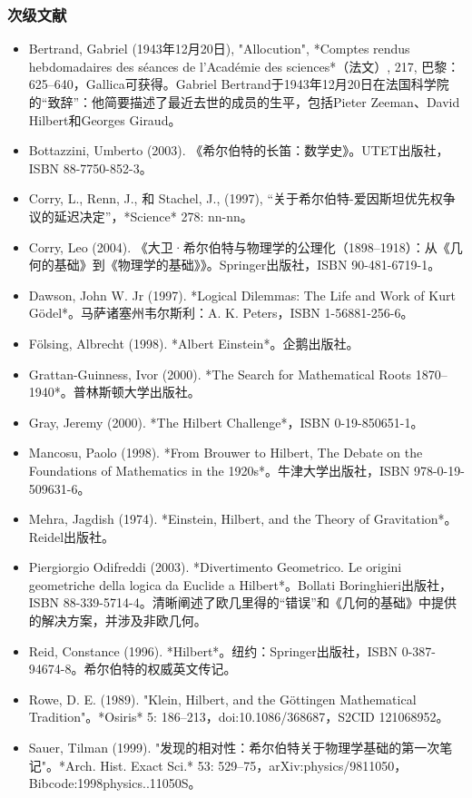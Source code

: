 \subsubsection{次级文献}
\begin{itemize}
\item Bertrand, Gabriel (1943年12月20日), "Allocution", *Comptes rendus hebdomadaires des séances de l'Académie des sciences*（法文）, 217, 巴黎：625–640，Gallica可获得。Gabriel Bertrand于1943年12月20日在法国科学院的“致辞”：他简要描述了最近去世的成员的生平，包括Pieter Zeeman、David Hilbert和Georges Giraud。
\item Bottazzini, Umberto (2003). 《希尔伯特的长笛：数学史》。UTET出版社，ISBN 88-7750-852-3。
\item Corry, L., Renn, J., 和 Stachel, J., (1997), “关于希尔伯特-爱因斯坦优先权争议的延迟决定”，*Science* 278: nn-nn。
\item Corry, Leo (2004). 《大卫·希尔伯特与物理学的公理化（1898–1918）：从《几何的基础》到《物理学的基础》》。Springer出版社，ISBN 90-481-6719-1。
\item Dawson, John W. Jr (1997). *Logical Dilemmas: The Life and Work of Kurt Gödel*。马萨诸塞州韦尔斯利：A. K. Peters，ISBN 1-56881-256-6。
\item Fölsing, Albrecht (1998). *Albert Einstein*。企鹅出版社。
\item Grattan-Guinness, Ivor (2000). *The Search for Mathematical Roots 1870–1940*。普林斯顿大学出版社。
\item Gray, Jeremy (2000). *The Hilbert Challenge*，ISBN 0-19-850651-1。
\item Mancosu, Paolo (1998). *From Brouwer to Hilbert, The Debate on the Foundations of Mathematics in the 1920s*。牛津大学出版社，ISBN 978-0-19-509631-6。
\item Mehra, Jagdish (1974). *Einstein, Hilbert, and the Theory of Gravitation*。Reidel出版社。
\item Piergiorgio Odifreddi (2003). *Divertimento Geometrico. Le origini geometriche della logica da Euclide a Hilbert*。Bollati Boringhieri出版社，ISBN 88-339-5714-4。清晰阐述了欧几里得的“错误”和《几何的基础》中提供的解决方案，并涉及非欧几何。
\item Reid, Constance (1996). *Hilbert*。纽约：Springer出版社，ISBN 0-387-94674-8。希尔伯特的权威英文传记。
\item Rowe, D. E. (1989). "Klein, Hilbert, and the Göttingen Mathematical Tradition"。*Osiris* 5: 186–213，doi:10.1086/368687，S2CID 121068952。
\item Sauer, Tilman (1999). "发现的相对性：希尔伯特关于物理学基础的第一次笔记"。*Arch. Hist. Exact Sci.* 53: 529–75，arXiv:physics/9811050，Bibcode:1998physics..11050S。

\end{itemize}
